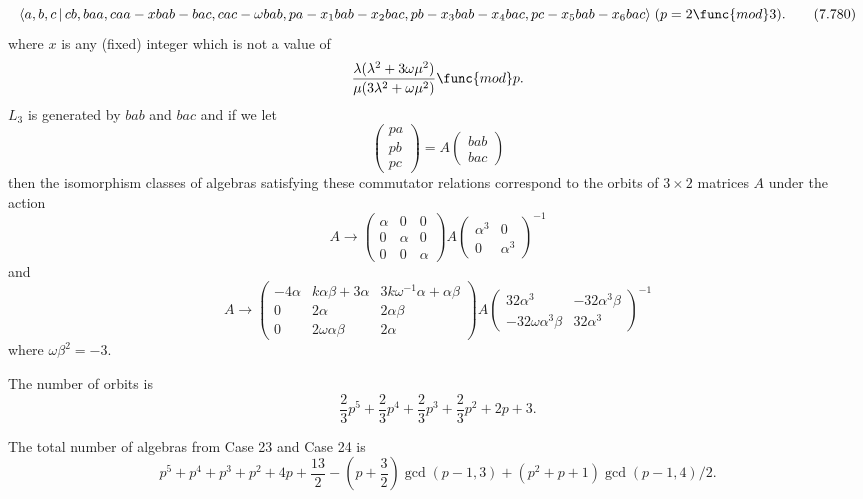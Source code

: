 \documentclass[10pt]{article}
\begin{document}
\begin{equation}
\langle a,b,c\,|\,cb,baa,caa-xbab-bac,cac-\omega
bab,pa-x_{1}bab-x_{2}bac,pb-x_{3}bab-x_{4}bac,pc-x_{5}bab-x_{6}bac\rangle
\;(p=2\func{mod}3).  \tag{7.780}
\end{equation}%
where $x$ is any (fixed) integer which is not a value of 
\[
\frac{\lambda (\lambda ^{2}+3\omega \mu ^{2})}{\mu (3\lambda ^{2}+\omega \mu
^{2})}\func{mod}p. 
\]%
$L_{3}$ is generated by $bab$ and $bac$ and if we let 
\[
\left( 
\begin{array}{l}
pa \\ 
pb \\ 
pc%
\end{array}%
\right) =A\left( 
\begin{array}{l}
bab \\ 
bac%
\end{array}%
\right) 
\]%
then the isomorphism classes of algebras satisfying these commutator
relations correspond to the orbits of $3\times 2$ matrices $A$ under the
action 
\[
A\rightarrow \left( 
\begin{array}{lll}
\alpha & 0 & 0 \\ 
0 & \alpha & 0 \\ 
0 & 0 & \alpha%
\end{array}%
\right) A\left( 
\begin{array}{ll}
\alpha ^{3} & 0 \\ 
0 & \alpha ^{3}%
\end{array}%
\right) ^{-1} 
\]%
and 
\[
A\rightarrow \left( 
\begin{array}{lll}
-4\alpha & k\alpha \beta +3\alpha & 3k\omega ^{-1}\alpha +\alpha \beta \\ 
0 & 2\alpha & 2\alpha \beta \\ 
0 & 2\omega \alpha \beta & 2\alpha%
\end{array}%
\right) A\left( 
\begin{array}{ll}
32\alpha ^{3} & -32\alpha ^{3}\beta \\ 
-32\omega \alpha ^{3}\beta & 32\alpha ^{3}%
\end{array}%
\right) ^{-1} 
\]%
where $\omega \beta ^{2}=-3$.

The number of orbits is 
\[
\allowbreak \frac{2}{3}p^{5}+\frac{2}{3}p^{4}+\frac{2}{3}p^{3}+\frac{2}{3}%
p^{2}+2p+3. 
\]

The total number of algebras from Case 23 and Case 24 is 
\[
p^{5}+p^{4}+p^{3}+p^{2}+4p+\frac{13}{2}-(p+\frac{3}{2})\gcd
(p-1,3)+(p^{2}+p+1)\gcd (p-1,4)/2. 
\]
\end{document}
